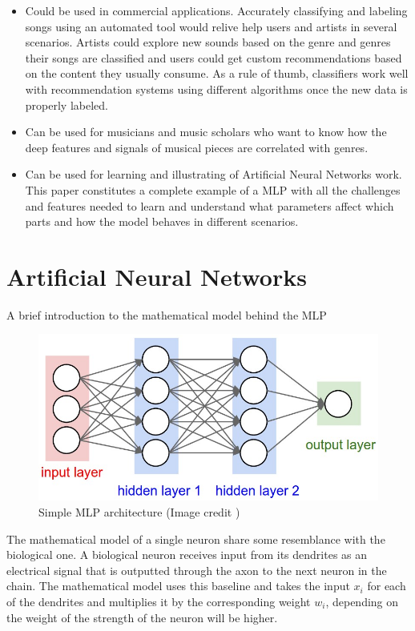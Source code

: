 \begin{itemize}
    \item Could be used in commercial applications. 
        Accurately classifying and labeling songs using an automated tool would relive help users and artists in several scenarios. 
        Artists could explore new sounds based on the genre and genres their songs are classified and users could get custom recommendations based on the content they usually consume. 
        As a rule of thumb, classifiers work well with recommendation systems using different algorithms once the new data is properly labeled.
	\item Can be used for musicians and music scholars who want to know how the deep features and signals of musical pieces are correlated with genres.
	\item Can be used for learning and illustrating of Artificial Neural Networks work. This paper constitutes a complete example of a MLP with all the challenges and features needed to learn and understand what parameters affect which parts and how the model behaves in different scenarios.
\end{itemize}

\newpage

\section{Artificial Neural Networks}
A brief introduction to the mathematical model behind the MLP
\begin{figure}[th]
    \centering
    \includegraphics[width=1.0\textwidth]{Figures/NeuralNet}
    \decoRule
    \caption[Simple MLP architecture]{Simple MLP architecture (Image credit \cite{cs231n})}
    \label{fig:mlp}
\end{figure}

The mathematical model of a single neuron share some resemblance with the biological one.
A biological neuron receives input from its dendrites as an electrical signal that is outputted through the axon to the next neuron in the chain.
The mathematical model uses this baseline and takes the input $x_i$ for each of the dendrites and multiplies it by the corresponding weight $w_i$,
depending on the weight of the strength of the neuron will be higher. 


